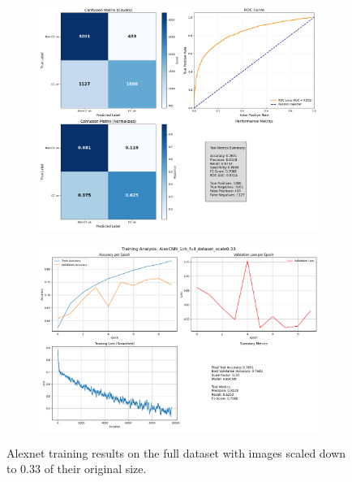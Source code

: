 \documentclass{pracalicmgr}
\begin{document}
\begin{figure}[H]
    \centering
    \begin{subfigure}{0.9\textwidth}
        \centering
        \includegraphics[width=\textwidth]{src/AlexCNN_1ch_full_dataset_scale033.png}
        \label{fig:full33sub1}
    \end{subfigure}
    
    \vspace{1cm}
    
    \begin{subfigure}{0.9\textwidth}
        \centering
        \includegraphics[width=\textwidth]{src/AlexCNN_1ch_full_dataset_scale0.33loss.png}
        \label{fig:full33sub2}
    \end{subfigure}
    \caption{Alexnet training results on the full dataset with images scaled down to 0.33 of their original size.}
    \label{fig:full33stacked}
\end{figure}
\end{document}
